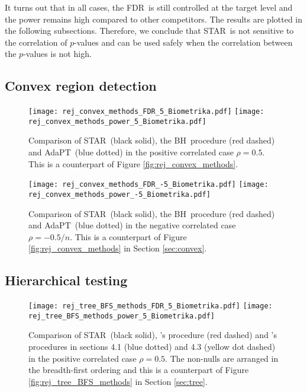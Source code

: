 \documentclass{biometrika}
\newcommand{\textFDR}{FDR}
\renewcommand{\star}{STAR}
\newcommand{\adapt}{AdaPT}
\newcommand{\bh}{BH}
\newcommand{\1}{\mathbf{1}}
\begin{document}
It turns out that in all cases, the \textFDR ~is still controlled at the target level and the power remains high compared to other competitors. The results are plotted in the following subsections. Therefore, we conclude that \star ~is not sensitive to the correlation of $p$-values and can be used safely when the correlation between the $p$-values is not high.

\subsection{Convex region detection}

\begin{figure}[h]
  \centering
  \texttt{[image: rej\_convex\_methods\_FDR\_5\_Biometrika.pdf]}
  \texttt{[image: rej\_convex\_methods\_power\_5\_Biometrika.pdf]}

  \caption{Comparison of \star ~(black solid), the \bh ~procedure (red dashed) and \adapt ~(blue dotted) in the positive correlated case $\rho = 0.5$. This is a counterpart of Figure \ref{fig:rej_convex_methods}.}\label{fig:rej_convex_methods_5}
\end{figure}

\begin{figure}[h]
  \centering
  \texttt{[image: rej\_convex\_methods\_FDR\_-5\_Biometrika.pdf]}
  \texttt{[image: rej\_convex\_methods\_power\_-5\_Biometrika.pdf]}
  \caption{Comparison of \star ~(black solid), the \bh ~procedure (red dashed) and \adapt ~(blue dotted) in the negative correlated case $\rho = -0.5/n$. This is a counterpart of Figure \ref{fig:rej_convex_methods} in Section \ref{sec:convex}.}\label{fig:rej_convex_methods_-5}
\end{figure}

\newpage
\subsection{Hierarchical testing}
\begin{figure}[h]
  \centering
  \texttt{[image: rej\_tree\_BFS\_methods\_FDR\_5\_Biometrika.pdf]}
  \texttt{[image: rej\_tree\_BFS\_methods\_power\_5\_Biometrika.pdf]}
  \caption{Comparison of \star ~(black solid), \cite{yekutieli08}'s procedure (red dashed) and \cite{lynch16}'s procedures in  sections 4.1 (blue dotted) and 4.3 (yellow dot dashed) in the positive correlated case $\rho = 0.5$. The non-nulls are arranged in the breadth-first ordering and this is a counterpart of Figure \ref{fig:rej_tree_BFS_methods} in Section \ref{sec:tree}.}\label{fig:rej_tree_BFS_methods_5}
\end{figure}
\end{document}
